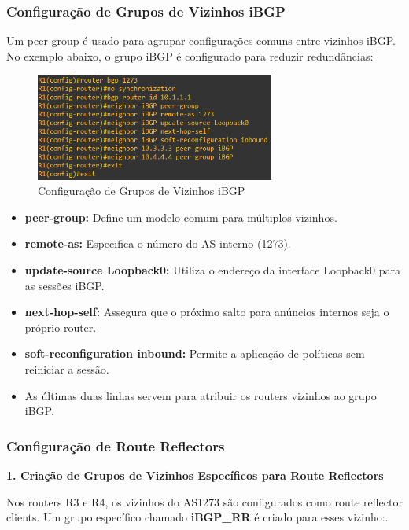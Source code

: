 \documentclass[11pt,english, openright, oneside]{book}
\begin{document}
\subsubsection{Configuração de Grupos de Vizinhos iBGP}
Um peer-group é usado para agrupar configurações comuns entre vizinhos iBGP. No exemplo abaixo, o grupo iBGP é configurado para reduzir redundâncias: \par

\begin{figure}[H]
  \centering
  \includegraphics[width=0.70\textwidth]{imagens/Tarefa2/4.png}
  \caption{Configuração de Grupos de Vizinhos iBGP}
  \label{fig:configGrupos}
\end{figure}

\begin{itemize}
  \item \textbf{peer-group:} Define um modelo comum para múltiplos vizinhos.
  \item \textbf{remote-as:} Especifica o número do AS interno (1273).
  \item \textbf{update-source Loopback0:} Utiliza o endereço da interface Loopback0 para as sessões iBGP.
  \item \textbf{next-hop-self:} Assegura que o próximo salto para anúncios internos seja o próprio router.
  \item \textbf{soft-reconfiguration inbound:} Permite a aplicação de políticas sem reiniciar a sessão.
  \item As últimas duas linhas servem para atribuir os routers vizinhos ao grupo iBGP.
\end{itemize}

\pagebreak
\subsubsection{Configuração de Route Reflectors}
\vspace{0.2cm}

\textbf{1. Criação de Grupos de Vizinhos Específicos para Route Reflectors} \par
Nos routers R3 e R4, os vizinhos do AS1273 são configurados como route reflector clients. Um grupo específico chamado \textbf{iBGP\_RR} é criado para esses vizinho:. \par
\end{document}
